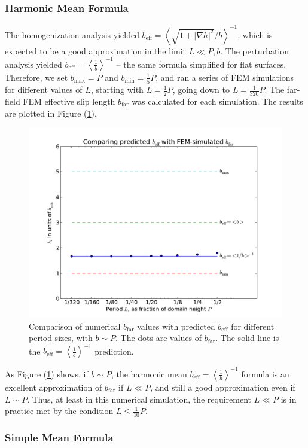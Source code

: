 \documentclass[12pt, a4paper, twoside, openright]{book}
\newcommand{\beff}{\ensuremath{b_{\mathrm{eff}}}}
\newcommand{\bmin}{\ensuremath{b_{\mathrm{min}}}}
\newcommand{\bmax}{\ensuremath{b_{\mathrm{max}}}}
\newcommand{\bfar}{\ensuremath{b_{\mathrm{far}}}}
\newcommand{\beffh}{\ensuremath{b_{\mathrm{eff}}} = \left< \frac{1}{b} \right>^{-1} }
\newcommand{\beffha}{\ensuremath{b_{\mathrm{eff}}} = \left< \sqrt{1 + |\nabla h|^2} / {b} \right>^{-1} }
\begin{document}
\subsubsection{Harmonic Mean Formula}
The homogenization analysis yielded $\beffha$, which is expected to be a good approximation in the limit $L \ll P,b$.  The perturbation analysis yielded $\beffh$ --  the same formula simplified for flat surfaces.  Therefore, we set $\bmax = P$ and $\bmin = \frac{1}{5}P$, and ran a series of FEM simulations for different values of $L$, starting with $L = \frac{1}{2}P$, going down to $L = \frac{1}{320}P$.  The far-field FEM effective slip length $\bfar$ was calculated for each simulation.  The results are plotted in Figure (\ref{FEMplotflatL}).

\begin{figure}[ht]
\includegraphics[scale=0.595]{Lund_Thesis_FEM_plot_flat_L}
\caption{Comparison of numerical $\bfar$ values with predicted $\beff$ for different period sizes, with $b \sim P$.  The dots are values of $\bfar$.  The solid line is the $\beffh$ prediction.}\label{FEMplotflatL}
\end{figure}

As Figure (\ref{FEMplotflatL}) shows, if $b \sim P$, the harmonic mean $\beffh$ formula is an excellent approximation of $\bfar$ if $L \ll P$, and still a good approximation even if $L \sim P$.  Thus, at least in this numerical simulation, the requirement $L \ll P$ is in practice met by the condition $L \leq \frac{1}{10}P$.

\clearpage
\subsubsection{Simple Mean Formula}
\end{document}
